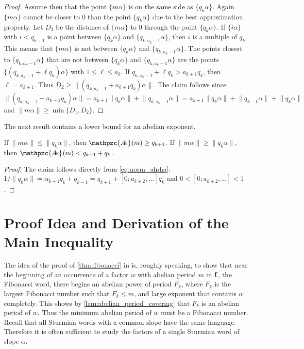 \documentclass[a4paper,fleqn]{article}
\providecommand{\norm}[1]{\lVert#1\rVert}
\newcommand{\infw}[1]{%
  \ifcat\noexpand#1\relax\bm{#1}%
  \else\mathbf{#1}\fi}          %
\newcommand{\abexp}[2][]{\mathpzc{A\mkern-3mu e}_{#1}(#2)}
\begin{document}
\begin{proof}
    Assume then that the point $\{m\alpha\}$ is on the same side as $\{q_k\alpha\}$. Again $\{m\alpha\}$ cannot be
    closer to $0$ than the point $\{q_k\alpha\}$ due to the best approximation property. Let $D_2$ be the distance of
    $\{m\alpha\}$ to $0$ through the point $\{q_k\alpha\}$. If $\{i\alpha\}$ with $i < q_{k+1}$ is a point between
    $\{q_k\alpha\}$ and $\{q_{k,a_k-1}\alpha\}$, then $i$ is a multiple of $q_k$. This means that $\{m\alpha\}$ is not
    between $\{q_k\alpha\}$ and $\{q_{k,a_k-1}\alpha\}$. The points closest to $\{q_{k,a_k-1}\alpha\}$ that are not
    between $\{q_k\alpha\}$ and $\{q_{k,a_k-1}\alpha\}$ are the points $\{(q_{k,a_k-1} + \ell q_k)\alpha\}$ with
    $1 \leq \ell \leq a_k$. If $q_{k,a_k-1} + \ell q_k > a_{k+1}q_k$, then $\ell = a_{k+1}$. Thus
    $D_2 \geq \norm{(q_{k,a_k-1} + a_{k+1} q_k)\alpha}$. The claim follows since
    \begin{equation*}
      \norm{(q_{k,a_k-1} + a_{k+1} q_k)\alpha} = a_{k+1}\norm{q_k\alpha} + \norm{q_{k,a_k-1}\alpha} = a_{k+1}\norm{q_k\alpha} + \norm{q_{k-1}\alpha} + \norm{q_k\alpha}
    \end{equation*}
    and $\norm{m\alpha} \geq \min\{D_1, D_2\}$.
  \end{proof}

  The next result contains a lower bound for an abelian exponent.

  \begin{lemma}\label{lem:exponent_lower_bound}
    If $\norm{m\alpha} \leq \norm{q_k\alpha}$, then $\abexp{m} \geq q_{k+1}$. If $\norm{m\alpha} \geq
    \norm{q_k\alpha}$, then $\abexp{m} < q_{k+1} + q_k$.
  \end{lemma}
  \begin{proof}
    The claim follows directly from \eqref{eq:norm_alpha}:
    $1/\norm{q_k\alpha} = \alpha_{k+1}q_k + q_{k-1} = q_{k+1} + [0; a_{k+2}, \ldots]q_k$ and
    $0 < [0; a_{k+2}, \ldots] < 1$.
  \end{proof}

  \section{Proof Idea and Derivation of the Main Inequality}\label{sec:main_inequality}
  The idea of the proof of \autoref{thm:fibonacci} in \cite{2016:abelian_powers_and_repetitions_in_sturmian_words} is,
  roughly speaking, to show that near the beginning of an occurrence of a factor $w$ with abelian period $m$ in
  $\infw{f}$, the Fibonacci word, there begins an abelian power of period $F_k$, where $F_k$ is the largest Fibonacci
  number such that $F_k \leq m$, and large exponent that contains $w$ completely. This shows by
  \autoref{lem:abelian_period_covering} that $F_k$ is an abelian period of $w$. Thus the minimum abelian period of $w$
  must be a Fibonacci number. Recall that all Sturmian words with a common slope have the same language. Therefore it
  is often sufficient to study the factors of a single Sturmian word of slope $\alpha$.
\end{document}
